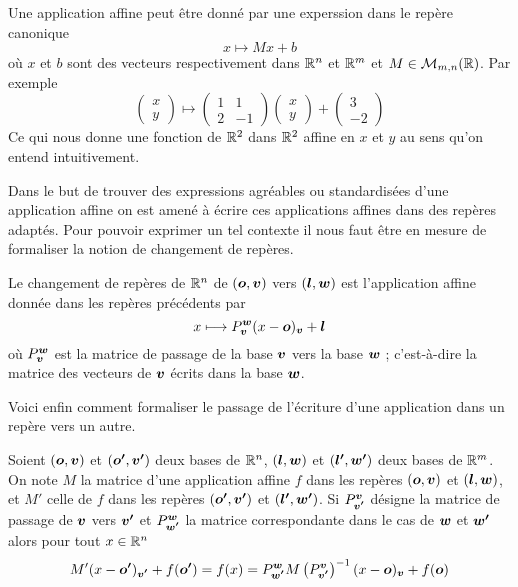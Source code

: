 \documentclass[11pt, a4paper]{article}
\begin{document}
\begin{exmp}
  Une application affine peut être donné par une experssion dans le
  repère canonique
  \[
  x \mapsto Mx + b
  \]
  où $x$ et $b$ sont des vecteurs respectivement dans $\mathbb{R}^n$ et $\mathbb{R}^m$
  et $M \in \mathcal{M}_{m, n}(\mathbb{R})$. Par exemple
  \[
  \begin{pmatrix} x \\ y \end{pmatrix} \mapsto \begin{pmatrix} 1 & 1
    \\ 2 & -1 \end{pmatrix}\begin{pmatrix} x \\ y \end{pmatrix}
  + \begin{pmatrix} 3 \\ -2 \end{pmatrix}
  \]
  Ce qui nous donne une fonction de $\mathbb{R}^2$ dans $\mathbb{R}^2$ affine en $x$
  et $y$ au sens qu'on entend intuitivement.
\end{exmp}
Dans le but de trouver des expressions agréables ou standardisées
d'une application affine on est amené à écrire ces applications
affines dans des repères adaptés. Pour pouvoir exprimer un tel
contexte il nous faut être en mesure de formaliser la notion
de changement de repères.
\begin{defn}
  Le changement de repères de $\mathbb{R}^n$ de $(\boldsymbol{o}, \boldsymbol{v})$ vers
  $(\boldsymbol{l}, \boldsymbol{w})$ est l'application affine donnée dans les repères
  précédents par
  \[
  x \longmapsto P_{\boldsymbol{v}}^{\boldsymbol{w}}(x - \boldsymbol{o})_{\boldsymbol{v}} + \boldsymbol{l}
  \]
  où $P_{\boldsymbol{v}}^{\boldsymbol{w}}$ est la matrice de passage de la base
  $\boldsymbol{v}$ vers la base $\boldsymbol{w}$ ; c'est-à-dire la matrice des
  vecteurs de $\boldsymbol{v}$ écrits dans la base $\boldsymbol{w}$.
\end{defn}
\noindent Voici enfin comment formaliser le passage de l'écriture
d'une application dans un repère vers un autre.
\begin{prop}
  Soient $(\boldsymbol{o}, \boldsymbol{v})$ et $(\boldsymbol{o'}, \boldsymbol{v'})$ deux bases de
  $\mathbb{R}^n$, $(\boldsymbol{l}, \boldsymbol{w})$ et $(\boldsymbol{l'}, \boldsymbol{w'})$ deux bases de
  $\mathbb{R}^m$. On note $M$ la matrice d'une application affine $f$ dans les
  repères $(\boldsymbol{o}, \boldsymbol{v})$ et $(\boldsymbol{l}, \boldsymbol{w})$, et $M'$ celle de
  $f$ dans les repères $(\boldsymbol{o'}, \boldsymbol{v'})$ et $(\boldsymbol{l'}, \boldsymbol{w'})$.
  Si $P_{\boldsymbol{v'}}^{\boldsymbol{v}}$ désigne la matrice de passage de $\boldsymbol{v}$
  vers $\boldsymbol{v'}$ et $P_{\boldsymbol{w'}}^{\boldsymbol{w}}$ la matrice correspondante
  dans le cas de $\boldsymbol{w}$ et $\boldsymbol{w'}$ alors pour tout $x \in \mathbb{R}^n$
  \[
  M'(x - \boldsymbol{o'})_{\boldsymbol{v'}} + f(\boldsymbol{o'}) = f(x) =
  P_{\boldsymbol{w'}}^{\boldsymbol{w}}M\left(P_{\boldsymbol{v'}}^{\boldsymbol{v}}\right)^{-1}(x -
  \boldsymbol{o})_{\boldsymbol{v}} + f(\boldsymbol{o})
  \]
\end{prop}
\end{document}
